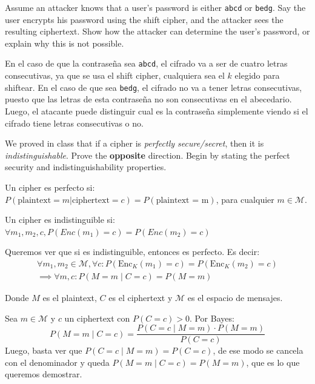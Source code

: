 \documentclass[12pt,addpoints,answers]{exam}
\begin{document}
\begin{questions}
\begin{parts}
\begin{solution}
    \end{solution}
\end{parts}


\question[10] Assume an attacker knows that a user’s password is either \texttt{abcd} or \texttt{bedg}.
Say the user encrypts his password using the shift cipher, and the attacker sees the resulting ciphertext. Show how the attacker can determine the user’s password, or explain why this is not possible.

\begin{solution}
    En el caso de que la contraseña sea \texttt{abcd}, el cifrado va a ser de cuatro letras consecutivas, ya que se usa el shift cipher, cualquiera sea el $k$ elegido para shiftear. En el caso de que sea \texttt{bedg}, el cifrado no va a tener letras consecutivas, puesto que las letras de esta contraseña no son consecutivas en el abecedario. 
    Luego, el atacante puede distinguir cual es la contraseña simplemente viendo si el cifrado tiene letras consecutivas o no.
\end{solution}


\question[10] We proved in class that if a cipher is {\em perfectly secure/secret}, then it is {\em indistinguishable}. Prove the \textbf{opposite} direction. Begin by stating the perfect security and indistinguishability properties.
\begin{solution}
    Un cipher es perfecto si: \\
    $P(\text{plaintext} = m | \text{ciphertext} = c) = P(\text{plaintext = m})$, para cualquier $m \in \mathcal{M}$.

    Un cipher es indistinguible si: \\
    $\forall m_1, m_2, c, P(Enc(m_1) = c) = P(Enc(m_2) = c)$

    Queremos ver que si es indistinguible, entonces es perfecto. Es decir:
    \begin{align*}
        \forall m_1, m_2 \in \mathcal{M}, \forall c: P(\text{Enc}_K(m_1) = c) = P(\text{Enc}_K(m_2) = c) \\  
        \implies \forall m, c: P(M = m \mid C = c) = P(M = m)
    \end{align*}
    
    Donde $M$ es el plaintext, $C$ es el ciphertext y $\mathcal{M}$ es el espacio de mensajes.

    Sea $m \in \mathcal{M}$ y $c$ un ciphertext con $P(C = c) > 0$. Por Bayes:
    \[
        P(M = m \mid C = c) = \frac{P(C = c \mid M = m) \cdot P(M = m)}{P(C = c)}
    \]
    Luego, basta ver que $P(C = c \mid M = m) = P(C = c)$, de ese modo se cancela con el denominador y queda $P(M = m \mid C = c) = P(M = m)$, que es lo que queremos demostrar. 


\end{solution}
\end{questions}
\end{document}
